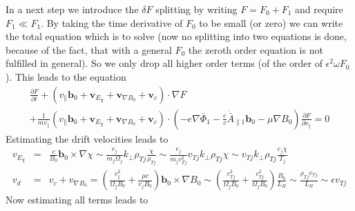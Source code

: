 In a next step we introduce the $\delta F$ splitting by writing
$F=F_0+F_1$ and require $F_1\ll F_1$. By taking the time derivative of
$F_0$ to be small (or zero) we can write the total equation which is
to solve (now no splitting into two equations is done, because of the
fact, that with a general $F_0$ the zeroth order equation is not
fulfilled in general). So we only drop all higher order terms (of the
order of $\epsilon^2\omega F_0$). This leads to the equation
\begin{multline*}
  \frac{\partial F}{\partial t}
  +\left(
    v_\|\mathbf{b}_0
    +\mathbf{v}_{E_\chi}
    +\mathbf{v}_{\nabla B_0}
    +\mathbf{v}_c
  \right)\cdot\nabla F\\
  +\frac{1}{mv_\|}\left(
    v_\|\mathbf{b}_0
    +\mathbf{v}_{E_\chi}
    +\mathbf{v}_{\nabla B_0}
    +\mathbf{v}_c
  \right)\cdot\left(
    -e\nabla\bar{\Phi}_1
    -\frac{e}{c}\dot{\bar{A}}_{\|1}\mathbf{b}_0
    -\mu\nabla B_0
  \right)\frac{\partial F}{\partial v_\|}
  =0
\end{multline*}
Estimating the drift velocities leads to
\begin{eqnarray*}
  v_{E_\chi}&=&\frac{c}{B_0}\mathbf{b}_0\times\nabla\chi
  \sim\frac{e_j}{m_j\Omega_j}k_\bot\rho_{Tj}\frac{\chi}{\rho_{Tj}}
  \sim\frac{e_j}{m_jv_{Tj}^2}v_{Tj}k_\bot\rho_{Tj}\chi
  \sim v_{Tj}k_\bot\rho_{Tj}\frac{e_j\chi}{T_j}\\
  v_d&=&v_c+v_{\nabla B_0}=\left(
    \frac{v_\|^2}{\Omega_jB_0}
    +\frac{\mu c}{e_jB_0}
  \right)\mathbf{b}_0\times\nabla B_0
  \sim\left(
    \frac{v_{Tj}^2}{\Omega_j B_0}
    +\frac{v_{Tj}^2}{\Omega_jB_0}
  \right)\frac{B_0}{L_B}
  \sim\frac{\rho_{Tj}v_{Tj}}{L_B}\sim\epsilon v_{Tj}
\end{eqnarray*}
Now estimating all terms leads to
